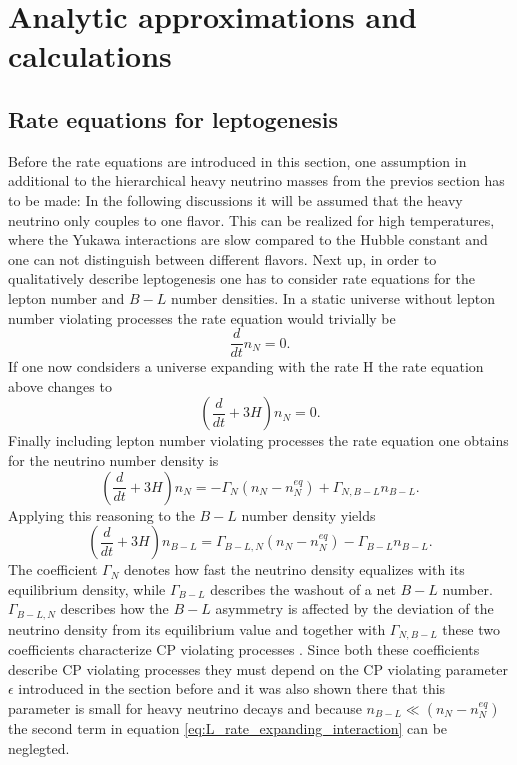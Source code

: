  \chapter{Analytic approximations and calculations}
\section{Rate equations for leptogenesis}
Before the rate equations are introduced in this section, one assumption in additional to the  hierarchical heavy neutrino masses from the previos section has to be made: In the following discussions it will be assumed that the heavy neutrino only couples to one flavor. This can be realized for high temperatures, where the Yukawa interactions are slow compared to the Hubble constant and one can not distinguish between different flavors. \cite[p. 15 f.]{Wormann:2016yyi}\newline\indent 
Next up, in order to qualitatively describe leptogenesis one has to consider rate equations for the lepton number and $B-L$ number densities. In a static universe without lepton number violating processes the rate equation would trivially be
\begin{equation}
	\frac{d}{dt}n_N=0.
	\label{eq:rate_static_nointeraction}
\end{equation}
If one now condsiders a universe expanding with the rate H the rate equation above changes to
\begin{equation}
\left(\frac{d}{dt}+3H\right)n_N=0.
\label{eq:rate_expanding_nointeraction}
\end{equation}
Finally including lepton number violating processes the rate equation one obtains for the neutrino number density is\cite[Eq. 2]{Bodeker:2013qaa}
\begin{equation}
\left(\frac{d}{dt}+3H\right)n_N=-\Gamma_N\left(n_N-n_N^{eq}\right)+\Gamma_{N,B-L}n_{B-L}.
\label{eq:L_rate_expanding_interaction}
\end{equation}
Applying this reasoning to the $B-L$ number density yields\cite[Eq. 3]{Bodeker:2013qaa}
\begin{equation}
\left(\frac{d}{dt}+3H\right)n_{B-L}=\Gamma_{B-L,N}\left(n_N-n_N^{eq}\right)-\Gamma_{B-L}n_{B-L}.
\label{eq:B-L_rate_expanding_interaction}
\end{equation}
The coefficient $\Gamma_N$ denotes how fast the neutrino density equalizes with its equilibrium density, while $\Gamma_{B-L}$ describes the washout of a net $B-L$ number. $\Gamma_{B-L,N}$ describes how the $B-L$ asymmetry is affected by the deviation of the neutrino density from its equilibrium value and together with $\Gamma_{N,B-L}$ these two coefficients characterize CP violating processes \cite[p. 4]{Bodeker:2013qaa}. Since both these coefficients describe CP violating processes they must depend on the CP violating parameter $\epsilon$ introduced in the section before and it was also shown there that this parameter is small for heavy neutrino decays and because $n_{B-L}\ll\left(n_N-n_N^{eq}\right)$ the second term in equation \eqref{eq:L_rate_expanding_interaction} can be neglegted. \newline\indent
